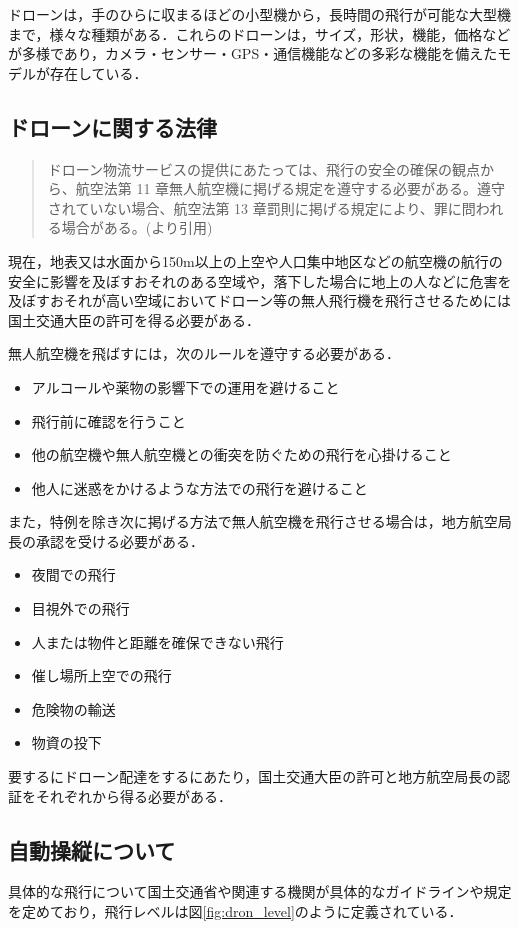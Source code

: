 \documentclass[a4paper, titlepage]{jsarticle}
\begin{document}
ドローンは，手のひらに収まるほどの小型機から，長時間の飛行が可能な大型機まで，様々な種類がある．これらのドローンは，サイズ，形状，機能，価格などが多様であり，カメラ・センサー・GPS・通信機能などの多彩な機能を備えたモデルが存在している．

\subsection{ドローンに関する法律}
\begin{quote}
  ドローン物流サービスの提供にあたっては、飛行の安全の確保の観点から、航空法第 11 章無人航空機に掲げる規定を遵守する必要がある。遵守されていない場合、航空法第 13 章罰則に掲げる規定により、罪に問われる場合がある。(\cite{delivery_guidelines_2023}より引用)
\end{quote}

現在，地表又は水面から150m以上の上空や人口集中地区などの航空機の航行の安全に影響を及ぼすおそれのある空域や，落下した場合に地上の人などに危害を及ぼすおそれが高い空域においてドローン等の無人飛行機を飛行させるためには国土交通大臣の許可を得る必要がある．

無人航空機を飛ばすには，次のルールを遵守する必要がある．\cite{prohibited_guidelines}
\begin{itemize}
  \item アルコールや薬物の影響下での運用を避けること
  \item 飛行前に確認を行うこと
  \item 他の航空機や無人航空機との衝突を防ぐための飛行を心掛けること
  \item 他人に迷惑をかけるような方法での飛行を避けること
\end{itemize}
また，特例を除き次に掲げる方法で無人航空機を飛行させる場合は，地方航空局長の承認を受ける必要がある．
\begin{itemize}
  \item 夜間での飛行
  \item 目視外での飛行
  \item 人または物件と距離を確保できない飛行
  \item 催し場所上空での飛行
  \item 危険物の輸送
  \item 物資の投下
\end{itemize}
要するにドローン配達をするにあたり，国土交通大臣の許可と地方航空局長の認証をそれぞれから得る必要がある．

\subsection{自動操縦について}
具体的な飛行について国土交通省や関連する機関が具体的なガイドラインや規定を定めており，飛行レベルは図\ref{fig:dron_level}のように定義されている．
\end{document}
